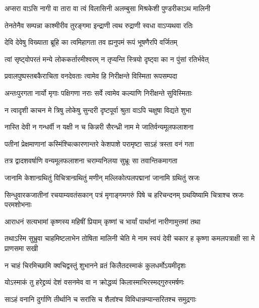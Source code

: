 \twolineshloka
{अप्सरा वाऽसि नागी वा तारा वा त्वं विलासिनी}
{अलम्बुसा मिश्रकेशी पुण्डरीकाऽथ मालिनी}


\twolineshloka
{तेनतेनैव सम्पन्ना काश्मीरीव तुरङ्गमा}
{इन्द्राणी त्वथ रुद्राणी स्वधा वाऽप्यथवा रतिः}


\twolineshloka
{देवि देवेषु विख्याता ब्रूहि का त्वमिहागता}
{तव ह्यनुपमं रूपं भूषणैरपि वर्जितम्}


\twolineshloka
{त्वां सृष्ट्वोपरतं मन्ये लोककर्तारमीश्वरम्}
{न तृप्यन्ति स्त्रियो दृष्ट्वा का न पुंसां रतिर्भवेत्}


\twolineshloka
{प्रवालपुष्पस्तबकैराचिता वनदेवताः}
{त्वामेव हि निरीक्षन्ते विस्मिता रूपसम्पदा}


\twolineshloka
{अन्तःपुरगता नार्यो मृगाः पक्षिगणा नराः}
{सर्वे त्वामेव कल्याणि निरीक्षन्ते सुविस्मिताः}


\twolineshloka
{न त्वादृशी काचन मे त्रिषु लोकेषु सुन्दरी}
{दृष्टपूर्वा श्रुता वाऽपि चक्षुषा विद्यते शुभा}




\twolineshloka
{नास्ति देवी न गन्धर्वी न यक्षी न च किन्नरी}
{सैरन्ध्री नाम मे जातिर्वन्यमूलफलाशना}


\twolineshloka
{पतीनां प्रेक्षमाणानां कस्मिंश्चित्कारणान्तरे}
{केशपाशे परामृष्टा साऽहं त्रस्ता वनं गता}


\twolineshloka
{तत्र द्वादशवर्षाणि वन्यमूलफलाशना}
{चराम्यनिलया सुभ्रूः सा तवान्तिकमागता}


\twolineshloka
{जानामि केशान्ग्रथितुं विचित्रान्ग्रथितुं मणीन्}
{मल्लिकोत्पलपद्मानां जानामि ग्रथितुं स्रजः}


\threelineshloka
{सिन्धुवारकजातीनां रचयाम्यवतंसकान्}
{पत्रं मृगाङ्गमगरुं पिषे च हरिचन्दनम्}
{ग्रथयिष्यामि चित्राश्च स्रजः परमशोभनाः}


\twolineshloka
{आराधनं सत्यभामां कृष्णस्य महिषीं प्रियाम्}
{कृष्णां च भार्यां पार्थानां नारीणामुत्तमां तथा}


\threelineshloka
{तथाऽस्मि सुभ्रुवा चाहमिष्टलाभेन तोषिता}
{मालिनी चेति मे नाम स्वयं देवी चकार ह}
{कृष्णा कमलपत्राक्षी सा मे प्राणसमा सखी}


\twolineshloka
{न चाहं चिरमिच्छामि क्वचिद्वस्तुं शुभानने}
{व्रतं किलैतदस्माकं कुलधर्मोऽयमीदृशः}


\twolineshloka
{योऽस्माकं तु हरेद्द्रव्यं देशं वसनमेव वा}
{न क्रोद्धव्यं किलास्माभिरस्मद्गुरुरमर्षणः}


\twolineshloka
{साऽहं वनानि दुर्गाणि तीर्थानि च सरांसि च}
{शैलांश्च विविधान्रम्यान्सरितश्च समुद्रगाः}


